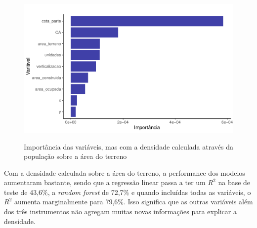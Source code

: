 \begin{figure}[h]
    \centering
    \caption{Importância das variáveis, mas com a densidade calculada através da população sobre a área do terreno}
    \includegraphics[width = .8\linewidth]{imagens/var_importance_densmod.pdf}
    \label{fig:importancia_densmod}
\end{figure}

Com a densidade calculada sobre a área do terreno, a performance dos modelos aumentaram bastante, sendo que a regressão linear passa a ter um $R^2$ na base de teste de 43,6\%, a \textit{random forest} de 72,7\% e quando incluídas todas as variáveis, o $R^2$ aumenta marginalmente para 79,6\%. Isso significa que as outras variáveis além dos três instrumentos não agregam muitas novas informações para explicar a densidade.